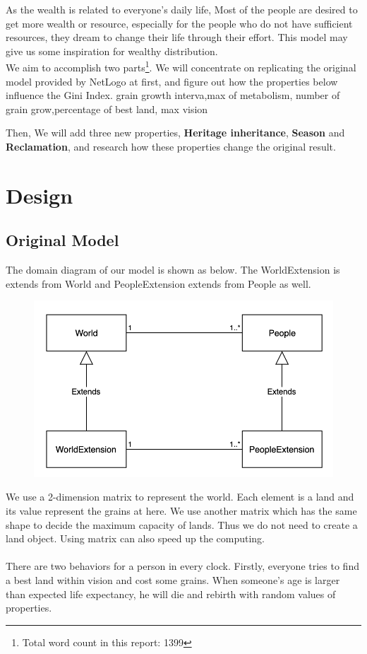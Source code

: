 As the wealth is related to everyone’s daily life, Most of the people are desired to get more wealth or resource, especially for the people who do not have sufficient resources, they dream to change their life through their effort. This model may give us some inspiration for wealthy distribution.\\

We aim to accomplish two parts\footnote{Total word count in this report: 1399}. We will concentrate on replicating the original model provided by NetLogo at first, and figure out how the properties below influence the Gini Index.
	grain growth interva,max of metabolism, number of grain grow,percentage of best land, max vision

Then, We will add three new properties, \textbf{Heritage inheritance}, \textbf{Season} and \textbf{Reclamation}, and research how these properties change the original result.
\section{Design}
\subsection{Original Model}
The domain diagram of our model is shown as below. The WorldExtension is extends from World and PeopleExtension extends from People as well.\\
\begin{figure}
	\begin{center}
		\includegraphics[scale=0.6]{domain.png}
	\end{center}
\end{figure}
We use a 2-dimension matrix to represent the world. Each element is a land and its value represent the grains at here. We use another matrix which has the same shape to decide the maximum capacity of lands. Thus we do not need to create a land object. Using matrix can also speed up the computing.\\
\\
There are two behaviors for a person in every clock. Firstly, everyone tries to find a best land within vision and cost some grains. When someone's age is larger than expected life expectancy, he will die and rebirth with random values of properties.
